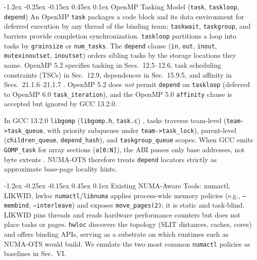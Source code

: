 \documentclass[10pt,twocolumn,letterpaper]{article}
\makeatletter
\renewcommand{\subsection}{\@startsection{subsection}{2}{\z@}%
  {-1.2ex \@plus -0.25ex \@minus -0.15ex}%
  {0.45ex \@plus 0.1ex}%
  {\normalfont\small\itshape}}
\makeatother
\begin{document}
\subsection{OpenMP Tasking Model (\texttt{task}, \texttt{taskloop}, \texttt{depend})}
An OpenMP \texttt{task} packages a code block and its data environment for deferred execution by any thread of the binding team; \texttt{taskwait}, \texttt{taskgroup}, and barriers provide completion synchronization. \texttt{taskloop} partitions a loop into tasks by \texttt{grainsize} or \texttt{num\_tasks}. The \texttt{depend} clause (\texttt{in}, \texttt{out}, \texttt{inout}, \texttt{mutexinoutset}, \texttt{inoutset}) orders sibling tasks by the storage locations they name. OpenMP 5.2 specifies tasking in Secs.~12.5--12.6, task scheduling constraints (TSCs) in Sec.~12.9, dependences in Sec.~15.9.5, and affinity in Secs.~21.1.6--21.1.7 \cite{ref7}. OpenMP 5.2 does \emph{not} permit \texttt{depend} on \texttt{taskloop} (deferred to OpenMP 6.0 \texttt{task\_iteration}), and the OpenMP 5.0 \texttt{affinity} clause is accepted but ignored by GCC 13.2.0.

In GCC 13.2.0 \texttt{libgomp} (\texttt{libgomp.h}, \texttt{task.c}) \cite{ref8}, tasks traverse team-level (\texttt{team->task\_queue}, with priority subqueues under \texttt{team->task\_lock}), parent-level (\texttt{children\_queue}, \texttt{depend\_hash}), and \texttt{taskgroup\_queue} scopes. When GCC emits \texttt{GOMP\_task} for array sections (\texttt{a[0:N]}), the ABI passes only base addresses, not byte extents \cite{ref16}. NUMA-OTS therefore treats \texttt{depend} locators strictly as approximate base-page locality hints.

\subsection{Existing NUMA-Aware Tools: numactl, LIKWID, hwloc}
\texttt{numactl}/\texttt{libnuma} \cite{ref14} applies process-wide memory policies (e.g., \texttt{--membind}, \texttt{--interleave}) and exposes \texttt{move\_pages(2)}; it is static and task-blind. LIKWID \cite{ref26} pins threads and reads hardware performance counters but does not place tasks or pages. \texttt{hwloc} \cite{ref22} discovers the topology (SLIT distances, caches, cores) and offers binding APIs, serving as a substrate on which runtimes such as NUMA-OTS would build. We emulate the two most common \texttt{numactl} policies as baselines in Sec.~VI.
\end{document}
